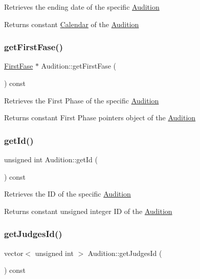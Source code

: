 Retrieves the ending date of the specific \hyperlink{class_audition}{Audition} \begin{DoxyReturn}{Returns}
constant \hyperlink{class_calendar}{Calendar} of the \hyperlink{class_audition}{Audition} 
\end{DoxyReturn}
\mbox{\label{class_audition_ada3e2914ec24b097e5ae728eb8e32470}} 
\subsubsection{\texorpdfstring{get\+First\+Fase()}{getFirstFase()}}
{\footnotesize\ttfamily \hyperlink{class_first_fase}{First\+Fase} $\ast$ Audition\+::get\+First\+Fase (\begin{DoxyParamCaption}{ }\end{DoxyParamCaption}) const}

Retrieves the First Phase of the specific \hyperlink{class_audition}{Audition} \begin{DoxyReturn}{Returns}
constant First Phase pointer\textquotesingle{}s object of the \hyperlink{class_audition}{Audition} 
\end{DoxyReturn}
\mbox{\label{class_audition_a938690d2670e525b808a6ba4aa485877}} 
\subsubsection{\texorpdfstring{get\+Id()}{getId()}}
{\footnotesize\ttfamily unsigned int Audition\+::get\+Id (\begin{DoxyParamCaption}{ }\end{DoxyParamCaption}) const}

Retrieves the ID of the specific \hyperlink{class_audition}{Audition} \begin{DoxyReturn}{Returns}
constant unsigned integer ID of the \hyperlink{class_audition}{Audition} 
\end{DoxyReturn}
\mbox{\label{class_audition_a405624b42fb47c297b3e11cc7c63e209}} 
\subsubsection{\texorpdfstring{get\+Judges\+Id()}{getJudgesId()}}
{\footnotesize\ttfamily vector$<$ unsigned int $>$ Audition\+::get\+Judges\+Id (\begin{DoxyParamCaption}{ }\end{DoxyParamCaption}) const}


